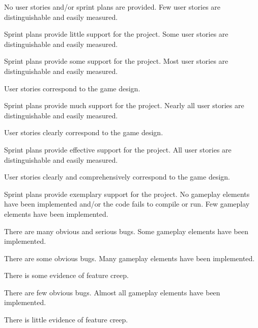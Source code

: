 \documentclass{../fal_assignment}
\begin{document}
\begin{markingrubric}
%
        \grade\fail No user stories and/or sprint plans are provided.
        \grade Few user stories are distinguishable and easily measured.
            \par Sprint plans provide little support for the project.
        \grade Some user stories are distinguishable and easily measured.
            \par Sprint plans provide some support for the project.
        \grade Most user stories are distinguishable and easily measured.
            \par User stories correspond to the game design.
            \par Sprint plans provide much support for the project.
        \grade Nearly all user stories are distinguishable and easily measured.
            \par User stories clearly correspond to the game design.
            \par Sprint plans provide effective support for the project.
        \grade All user stories are distinguishable and easily measured.
            \par User stories clearly and comprehensively correspond to the game design.
            \par Sprint plans provide exemplary support for the project.
%
        \grade\fail No gameplay elements have been implemented and/or the code fails to compile or run.
        \grade Few gameplay elements have been implemented.
            \par There are many obvious and serious bugs.
        \grade Some gameplay elements have been implemented.
            \par There are some obvious bugs.
        \grade Many gameplay elements have been implemented.
            \par There is some evidence of feature creep.
            \par There are few obvious bugs.
        \grade Almost all gameplay elements have been implemented.
            \par There is little evidence of feature creep.

\end{markingrubric}
\end{document}
